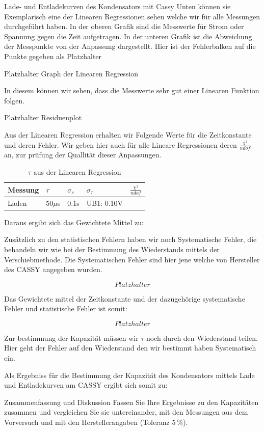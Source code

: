 \documentclass[twoside]{protokoll}
\begin{document}
\begin{aufgabe}{Lade- und Entladekurven des Kondensators mit Cassy}
Unten können sie Exemplarisch eine der Linearen Regressionen sehen welche wir für alle Messungen durchgeführt haben.
In der oberen Grafik sind die Messwerte für Strom oder Spannung gegen die Zeit aufgetragen.
In der unteren Grafik ist die Abweichung der Messpunkte von der Anpassung dargestellt. 
Hier ist der Fehlerbalken auf die Punkte gegeben als Platzhalter

Platzhalter Graph der Linearen Regression

In diesem können wir sehen, dass die Messwerte sehr gut einer Linearen Funktion folgen. 

Platzhalter Residuenplot

Aus der Linearen Regression erhalten wir Folgende Werte für die Zeitkonstante und deren Fehler. Wir geben hier auch für alle Lineare Regressionen deren $\frac{\chi^2}{ndof}$ an, zur prüfung der Quallität dieser Anpassungen.

\begin{table}[H]
        \centering
        \begin{tabularx}{1\textwidth}{X X X X X} %
            \toprule
            \textbf{Messung} & \textbf{$\tau$} & \textbf{$\sigma_s$} & \textbf{$\sigma_{\tau}$} & $\frac{\chi^2}{ndof}$ \\
            \midrule
            Laden & 50$\mu$s  & 0.1s & UB1: 0.10V \\

            \bottomrule
        \end{tabularx}
        \caption{$\tau$ aus der Linearen Regression}
        \label{tab:mytable}
    \end{table}
    
 
Daraus ergibt sich das Gewichtete Mittel zu:

Zusätzlich zu den statistischen Fehlern haben wir noch Systematische Fehler, die behandeln wir wie bei der Bestimmung des Wiederstands mittels der Verschiebmethode. 
Die Systematischen Fehler sind hier jene welche von Hersteller des CASSY angegeben wurden. 

\begin{equation}
Platzhalter
\end{equation}

Das Gewichtete mittel der Zeitkonstante und der dazugehörige systematische Fehler und statistische Fehler ist somit:

\begin{equation}
 Platzhalter
\end{equation}

Zur bestimmung der Kapazität müssen wir $\tau$ noch durch den Wiederstand teilen. Hier geht der Fehler auf den Wiederstand den wir bestimmt haben Systematisch ein. 

Als Ergebniss für die Bestimmung der Kapazität des Kondensators mittels Lade und Entladekurven am CASSY ergibt sich somit zu:


\end{aufgabe}

\begin{aufgabe}{Zusammenfassung und Diskussion}
  Fassen Sie Ihre Ergebnisse zu den Kapazitäten zusammen und
  vergleichen Sie sie untereinander, mit den Messungen aus dem
  Vorversuch und mit den Herstellerangaben (Toleranz
  $\SI{5}{\percent}$).  

\end{aufgabe}
 
\end{document}
